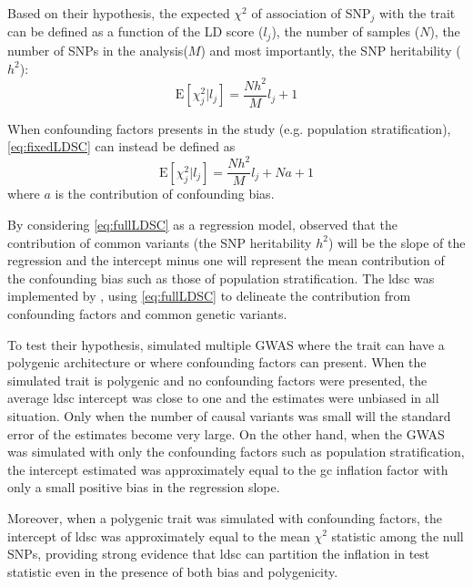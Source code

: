 \documentclass[12pt]{scrbook}
\begin{document}
	Based on their hypothesis, the expected $\chi^2$ of association of \gls{SNP}$_j$ with the trait can be defined as a function of the \gls{LD} score ($l_j$), the number of samples ($N$), the number of \glspl{SNP} in the analysis($M$) and most importantly, the \gls{SNP} heritability ($h^2$):
	\begin{equation}
	\mathrm{E}[\chi^2_j | l_j] = \frac{Nh^2}{M}l_j+1
	\label{eq:fixedLDSC}
	\end{equation}
	
	When confounding factors presents in the study (e.g. population stratification), \cref{eq:fixedLDSC} can instead be defined as
	\begin{equation}
	\mathrm{E}[\chi^2_j | l_j] = \frac{Nh^2}{M}l_j+Na+1
	\label{eq:fullLDSC}
	\end{equation}
	where $a$ is the contribution of confounding bias.
	
	By considering \cref{eq:fullLDSC} as a regression model, \citet{Bulik-Sullivan2015} observed that the contribution of common variants (the \gls{SNP} heritability $h^2$) will be the slope of the regression and the intercept minus one will represent the mean contribution of the confounding bias such as those of population stratification. 
	The \gls{ldsc} was implemented by \citet{Bulik-Sullivan2015}, using \cref{eq:fullLDSC} to delineate the contribution from confounding factors and common genetic variants.
	
	To test their hypothesis, \citet{Bulik-Sullivan2015} simulated multiple \gls{GWAS} where the trait can have a polygenic architecture or where confounding factors can present.
	When the simulated trait is polygenic and no confounding factors were presented, the average \gls{ldsc} intercept was close to one and the estimates were unbiased in all situation.
	Only when the number of causal variants was small will the standard error of the estimates become very large.
	On the other hand, when the \gls{GWAS} was simulated with only the confounding factors such as population stratification, the intercept estimated was approximately equal to the \gls{gc} inflation factor with only a small positive bias in the regression slope.
	
	Moreover, when a polygenic trait was simulated with confounding factors, the intercept of \gls{ldsc} was approximately equal to the mean $\chi^2$ statistic among the null \glspl{SNP}, providing strong evidence that \gls{ldsc} can partition the inflation in test statistic even in the presence of both bias and polygenicity.
	
\end{document}
